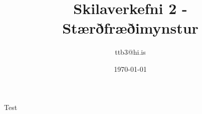 \documentclass{article}
\title{Skilaverkefni 2 - Stærðfræðimynstur}
\author{ttb3@hi.is}
\date{\today}
\begin{document}
\maketitle

Test
\end{document}
